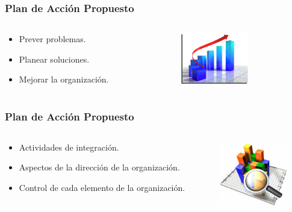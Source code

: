 \frame
{
\frametitle{Plan de Acción Propuesto}
\begin{columns}
	\begin{column}{0.6\textwidth}
		\begin{itemize}
			\item Prever problemas.
			\item Planear soluciones.
			\item Mejorar la organización.
		\end{itemize}
	\end{column}
    \begin{column}{0.4\textwidth}
        \includegraphics[width=3cm]{img/quality}
    \end{column}
\end{columns}
}

\frame
{
\frametitle{Plan de Acción Propuesto}
\begin{columns}
	\begin{column}{0.6\textwidth}
		\begin{itemize}
			\item Actividades de integración.
			\item Aspectos de la dirección de la organización.
			\item Control de cada elemento de la organización.
		\end{itemize}
	\end{column}
    \begin{column}{0.4\textwidth}
        \includegraphics[width=3cm]{img/quantity}
    \end{column}
\end{columns}
}

